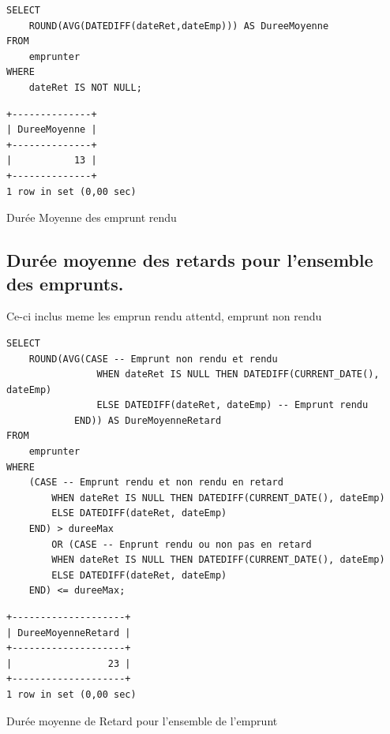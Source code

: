 \documentclass{article}
\begin{document}
\begin{center}
\begin{minipage}{0.6\linewidth}
\begin{listing}[H]
\begin{verbatim}
SELECT 
    ROUND(AVG(DATEDIFF(dateRet,dateEmp))) AS DureeMoyenne
FROM
    emprunter
WHERE
    dateRet IS NOT NULL;
\end{verbatim}
\begin{verbatim}
+--------------+
| DureeMoyenne |
+--------------+
|           13 |
+--------------+
1 row in set (0,00 sec)
\end{verbatim}
\caption{Durée Moyenne des emprunt rendu}
\end{listing}
\end{minipage}
\end{center}

\subsection{Durée moyenne des retards pour l’ensemble des emprunts.}

Ce-ci inclus meme les emprun rendu attentd, emprunt non rendu
\begin{center}
\begin{minipage}{0.8\linewidth}
\begin{listing}[H]
\begin{verbatim}
SELECT 
    ROUND(AVG(CASE -- Emprunt non rendu et rendu
                WHEN dateRet IS NULL THEN DATEDIFF(CURRENT_DATE(), dateEmp) 
                ELSE DATEDIFF(dateRet, dateEmp) -- Emprunt rendu
            END)) AS DureMoyenneRetard
FROM
    emprunter
WHERE
    (CASE -- Emprunt rendu et non rendu en retard
        WHEN dateRet IS NULL THEN DATEDIFF(CURRENT_DATE(), dateEmp) 
        ELSE DATEDIFF(dateRet, dateEmp)
    END) > dureeMax
        OR (CASE -- Enprunt rendu ou non pas en retard
        WHEN dateRet IS NULL THEN DATEDIFF(CURRENT_DATE(), dateEmp)
        ELSE DATEDIFF(dateRet, dateEmp)
    END) <= dureeMax;
\end{verbatim}
\begin{verbatim}
+--------------------+
| DureeMoyenneRetard |
+--------------------+
|                 23 |
+--------------------+
1 row in set (0,00 sec)
\end{verbatim}
\caption{Durée moyenne de Retard pour l'ensemble de l'emprunt}
\end{listing}
\end{minipage}
\end{center}
\end{document}
